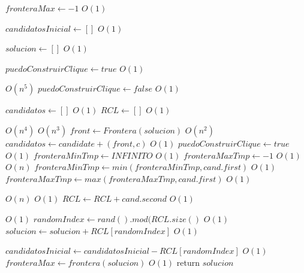 \begin{algorithm}[H]
\begin{algorithmic}
    \State $fronteraMax \gets -1$   \Comment $O(1)$

    \State $candidatosInicial \gets []$   \Comment $O(1)$

    \State $solucion \gets []$   \Comment $O(1)$

    \State $puedoConstruirClique \gets true$   \Comment $O(1)$

       \Comment $O(n^5)$
        \State $puedoConstruirClique \gets false$   \Comment $O(1)$

        \State $candidatos \gets []$   \Comment $O(1)$
        \State $RCL \gets []$   \Comment $O(1)$

           \Comment $O(n^4)$
               \Comment $O(n^3)$
                \State $front \gets Frontera(solucion)$   \Comment $O(n^2)$
                \State $candidatos \gets candidate + (front, c)$   \Comment $O(1)$
                \State $puedoConstruirClique \gets true$   \Comment $O(1)$
            \EndIf
        \EndFor
        \State $fronteraMinTmp \gets INFINITO$   \Comment $O(1)$
        \State $fronteraMaxTmp \gets -1$   \Comment $O(1)$
           \Comment $O(n)$
            \State $fronteraMinTmp \gets min(fronteraMinTmp, cand.first)$   \Comment $O(1)$
            \State $fronteraMaxTmp \gets max(fronteraMaxTmp, cand.first)$   \Comment $O(1)$
        \EndFor

           \Comment $O(n)$
               \Comment $O(1)$
                \State $RCL \gets RCL + cand.second$   \Comment $O(1)$
            \EndIf
        \EndFor

           \Comment $O(1)$
            \State $randomIndex \gets rand().mod(RCL.size()$   \Comment $O(1)$
            \State $solucion \gets solucion + RCL[randomIndex]$   \Comment $O(1)$

            \State $candidatosInicial \gets candidatosInicial - RCL[randomIndex]$   \Comment $O(1)$
        \EndIf
    \EndWhile
    \State $fronteraMax \gets frontera(solucion)$   \Comment $O(1)$
    \State return $solucion$
\EndFunction
\end{algorithmic}
\end{algorithm}


